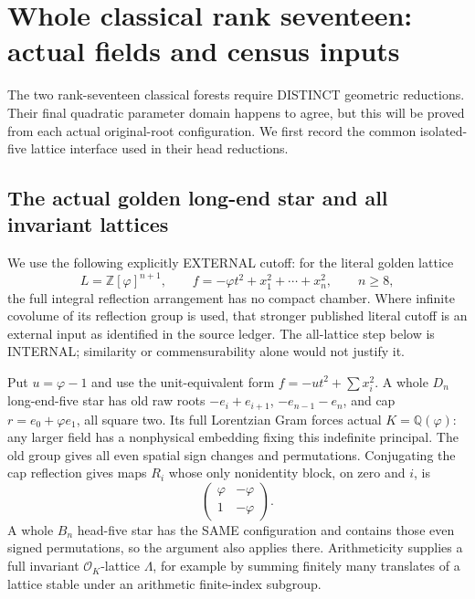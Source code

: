 \section{Whole classical rank seventeen: actual fields and census inputs}
\label{app:arithBD17actual}

The two rank-seventeen classical forests require
DISTINCT geometric reductions.
Their final quadratic parameter domain happens
to agree, but this will be proved from each
actual original-root configuration.
We first record the common isolated-five lattice
interface used in their head reductions.

\subsection{The actual golden long-end star and all invariant lattices}
\label{app:arithgoldenlongstar}

We use the following explicitly EXTERNAL cutoff:
for the literal golden lattice
\[
 L=\mathbb Z[\varphi]^{n+1},\qquad
 f=-\varphi t^2+x_1^2+\cdots+x_n^2,\qquad n\ge8,
\]
the full integral reflection arrangement has no
compact chamber.
Where infinite covolume of its reflection group
is used, that stronger published literal cutoff
is an external input as identified in the source ledger.
The all-lattice step below is INTERNAL; similarity
or commensurability alone would not justify it.

Put \(u=\varphi-1\) and use the unit-equivalent
form \(f=-ut^2+\sum x_i^2\).
A whole \(D_n\) long-end-five star has old raw
roots \(-e_i+e_{i+1}\), \(-e_{n-1}-e_n\),
and cap \(r=e_0+\varphi e_1\), all square two.
Its full Lorentzian Gram forces actual
\(K=\mathbb Q(\varphi)\): any larger field has
a nonphysical embedding fixing this indefinite
principal.
The old group gives all even spatial sign
changes and permutations.
Conjugating the cap reflection gives maps \(R_i\)
whose only nonidentity block, on zero and \(i\), is
\[
                         \begin{pmatrix}\varphi&-\varphi\\
                                          1&-\varphi\end{pmatrix}.
\]
A whole \(B_n\) head-five star has the SAME
configuration and contains those even signed
permutations, so the argument also applies there.
Arithmeticity supplies a full invariant
\(\mathcal O_K\)-lattice \(\Lambda\), for example
by summing finitely many translates of a lattice
stable under an arithmetic finite-index subgroup.

